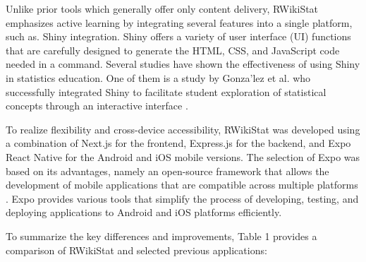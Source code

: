 \documentclass[conference,a4paper]{IEEEtran}
\begin{document}
Unlike prior tools which generally offer only content delivery, RWikiStat emphasizes active learning by integrating several features into a single platform, such as. Shiny integration. Shiny offers a variety of user interface (UI) functions that are carefully designed to generate the HTML, CSS, and JavaScript code needed in a command. Several studies have shown the effectiveness of using Shiny in statistics education. One of them is a study by Gonza'lez et al. who successfully integrated Shiny to facilitate student exploration of statistical concepts through an interactive interface \cite{b16}.

To realize flexibility and cross-device accessibility, RWikiStat was developed using a combination of Next.js for the frontend, Express.js for the backend, and Expo React Native for the Android and iOS mobile versions. The selection of Expo was based on its advantages, namely an open-source framework that allows the development of mobile applications that are compatible across multiple platforms \cite{b17}. Expo provides various tools that simplify the process of developing, testing, and deploying applications to Android and iOS platforms efficiently.

To summarize the key differences and improvements, Table 1 provides a comparison of RWikiStat and selected previous applications:

\begin{table}[h!]
  \centering
  \caption{Comparison of Features Across Educational Apps}
  \renewcommand{\arraystretch}{1.4}
  \label{tab:comparison}
\end{table}
\end{document}

